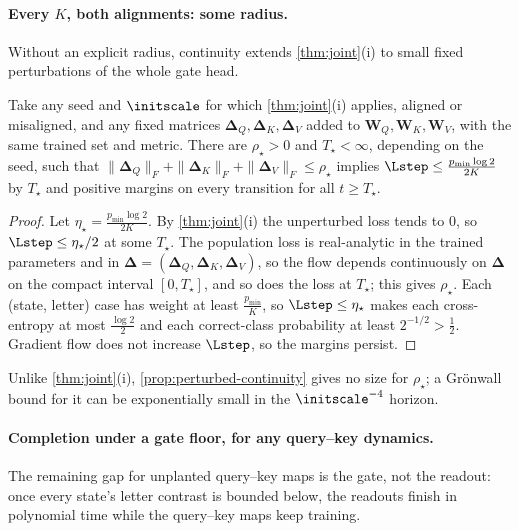 \paragraph{Every $K$, both alignments: some radius.} Without an explicit radius, continuity extends \cref{thm:joint}(i) to small fixed perturbations
of the whole gate head.

\begin{proposition}
\label{prop:perturbed-continuity}
Take any seed and $\initscale$ for which \cref{thm:joint}(i) applies, aligned or misaligned, and any fixed matrices $\bm\Delta_Q,\bm\Delta_K,\bm\Delta_V$ added to
$\mathbf W_Q,\mathbf W_K,\mathbf W_V$, with the same trained set and metric. There are $\rho_\star>0$ and $T_\star<\infty$, depending on the seed, such that
$\|\bm\Delta_Q\|_F+\|\bm\Delta_K\|_F+\|\bm\Delta_V\|_F\le\rho_\star$ implies $\Lstep\le\frac{p_{\min}\log2}{2K}$ by $T_\star$ and positive margins on every
transition for all $t\ge T_\star$.
\end{proposition}

\begin{proof}
Let $\eta_\star=\frac{p_{\min}\log2}{2K}$. By \cref{thm:joint}(i) the unperturbed loss tends to $0$, so $\Lstep\le\eta_\star/2$ at some $T_\star$. The
population loss is real-analytic in the trained parameters and in $\bm\Delta=(\bm\Delta_Q,\bm\Delta_K,\bm\Delta_V)$, so the flow depends continuously on
$\bm\Delta$ on the compact interval $[0,T_\star]$, and so does the loss at $T_\star$; this gives $\rho_\star$. Each (state, letter) case has weight at
least $\frac{p_{\min}}K$, so $\Lstep\le\eta_\star$ makes each cross-entropy at most $\frac{\log2}2$ and each correct-class probability at least
$2^{-1/2}>\frac12$. Gradient flow does not increase $\Lstep$, so the margins persist.
\end{proof}

Unlike \cref{thm:joint}(i), \cref{prop:perturbed-continuity} gives no size for $\rho_\star$; a Gr\"onwall bound for it can be exponentially small
in the $\initscale^{-4}$ horizon.

\paragraph{Completion under a gate floor, for any query--key dynamics.} The remaining gap for unplanted query--key maps is the gate, not
the readout: once every state's letter contrast is bounded below, the readouts finish in polynomial time while the query--key maps keep training.

